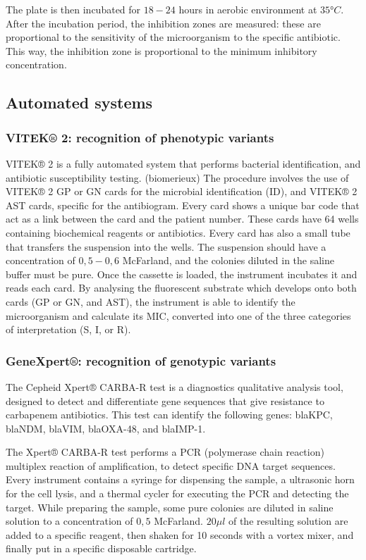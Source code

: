 \documentclass[11pt]{report}
\begin{document}
The plate is then incubated for $18-24$ hours in aerobic environment at $35°C$.
After the incubation period, the inhibition zones are measured: these are proportional to the sensitivity of the microorganism to the specific antibiotic. 
This way, the inhibition zone is proportional to the minimum inhibitory concentration.

\subsection{Automated systems}
\subsubsection{VITEK® 2: recognition of phenotypic variants}
VITEK® 2 is a fully automated system that performs bacterial identification, and antibiotic susceptibility testing. (biomerieux) %
The procedure involves the use of VITEK® 2 GP or GN cards for the microbial identification (ID), and VITEK® 2 AST cards, specific for the antibiogram.
Every card shows a unique bar code that act as a link between the card and the patient number.
These cards have 64 wells 
containing biochemical reagents or antibiotics. Every card has also a small tube that transfers the suspension into the wells.
The suspension should have a concentration of $0,5-0,6$ McFarland, and the colonies diluted in the saline buffer must be pure.
Once the cassette is loaded, the instrument incubates it and reads each card.
By analysing the fluorescent substrate which develops onto both cards (GP or GN, and AST), the instrument is able to identify the microorganism and calculate its MIC, converted into one of the three categories of interpretation (S, I, or R).

\subsubsection{GeneXpert®: recognition of genotypic variants}
The Cepheid Xpert® CARBA-R test is a diagnostics qualitative analysis tool, designed to detect and differentiate gene sequences that give resistance to carbapenem antibiotics.
This test can identify the following genes: blaKPC, blaNDM, blaVIM, blaOXA-48, and blaIMP-1.

The Xpert® CARBA-R test performs a PCR (polymerase chain reaction) multiplex reaction of amplification, to detect specific DNA target sequences.
Every instrument contains a syringe for dispensing the sample, a ultrasonic horn for the cell lysis, and a thermal cycler for executing the PCR and detecting the target.
While preparing the sample, some pure colonies are diluted in saline solution to a concentration of $0,5$ McFarland. 
$20\mu l$ of the resulting solution are added to a specific reagent, then shaken for 10 seconds with a vortex mixer, and finally put in a specific disposable cartridge.
\end{document}
